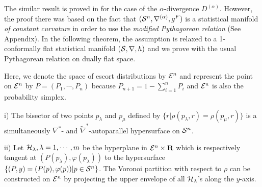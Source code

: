 \documentclass{llncs}
\begin{document}
The similar result is proved in \cite{OMA12} for the case of 
the $\alpha$-divergence $D^{(\alpha)}$.
However, the proof there was based on the fact that 
$({\cal S}^n,\nabla^{(\alpha)},g^F)$ is a statistical manifold {\em of 
constant curvature} in order to use 
the {\em modified Pythagorean relation} (See Appendix).
In the following theorem,  
the assumption is relaxed to a 1-conformally flat 
statistical manifold $({\cal S}, \nabla, h)$ and 
we prove with the usual Pythagorean relation on dually flat space.

Here, we denote the space of escort distributions by ${\cal E}^n$ and 
represent the point on ${\cal E}^n$ by $P=(P_1,\cdots,P_n)$ because 
$P_{n+1}=1-\sum_{i=1}^n P_i$ and ${\cal E}^n$ is also the probability 
simplex.

\begin{theorem}
\begin{description}
\item{i)} The bisector of two points $p_\lambda$ and $p_\mu$ defined by 
$\{r |\rho(p_\lambda,r)=\rho(p_\mu,r)\}$ 
is a simultaneously $\nabla^*$- and $\tilde \nabla^*$-autoparallel 
hypersurface on ${\cal S}^n$.
\item{ii)} 
Let ${\cal H}_\lambda, \lambda=1,\cdots,m$ be the hyperplane in 
${\cal E}^n \times {\bf R}$ which is respectively tangent 
at $(P(p_\lambda),  \varphi(p_\lambda))$ to the hypersurface 
$\{(P,y)=(P(p), \varphi(p)) | p \in {\cal S}^n \}$. %
The Voronoi partition with respect to $\rho$
can be constructed on ${\cal E}^n$ by projecting 
the upper envelope of all ${\cal H}_\lambda$'s 
along the $y$-axis.
\end{description}
\end{theorem}
\end{document}

